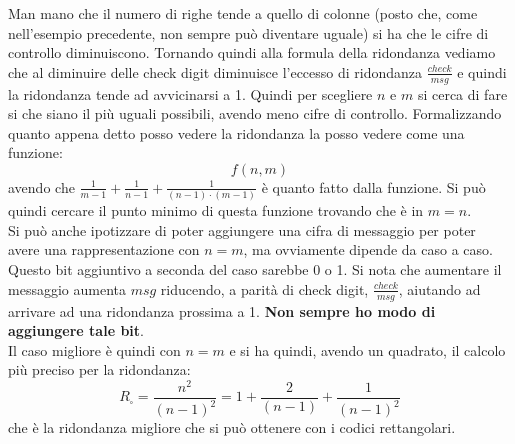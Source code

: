 \documentclass[a4paper,12pt, oneside]{book}
\begin{document}
Man mano che il numero di righe tende a quello di colonne (posto che, come
nell'esempio precedente, non sempre può diventare uguale) si ha che le cifre di
controllo diminuiscono. Tornando quindi alla formula della ridondanza vediamo
che al diminuire delle check digit diminuisce l'eccesso di ridondanza
$\frac{check}{msg}$ e quindi la ridondanza tende ad avvicinarsi a 1.
Quindi per scegliere $n$ e $m$ si cerca di fare si che siano il più uguali
possibili, avendo meno cifre di controllo.
Formalizzando quanto appena detto posso vedere la ridondanza la posso vedere
come una funzione: 
\[f(n,m)\]
avendo che $\frac{1}{m-1}+\frac{1}{n-1}+\frac{1}{(n-1)\cdot (m-1)}$ è quanto
fatto dalla funzione.
Si può quindi cercare il punto minimo di questa funzione trovando che è in
$m=n$.\\
Si può anche ipotizzare di poter aggiungere una cifra di messaggio per poter
avere una rappresentazione con $n=m$, ma ovviamente dipende da caso a
caso. Questo bit aggiuntivo a seconda del caso sarebbe 0 o 1. Si nota che
aumentare il messaggio aumenta $msg$ riducendo, a parità di check digit,
$\frac{check}{msg}$, aiutando ad arrivare ad una ridondanza prossima a
1. \textbf{Non sempre ho modo di aggiungere tale bit}.\\
Il caso migliore è quindi con $n=m$ e si ha quindi, avendo un quadrato, il
calcolo più preciso per la ridondanza:
\[R_\square=\frac{n^2}{(n-1)^2}=1+\frac{2}{(n-1)}+\frac{1}{(n-1)^2}\]
che è la ridondanza migliore che si può ottenere con i codici rettangolari.
\end{document}
